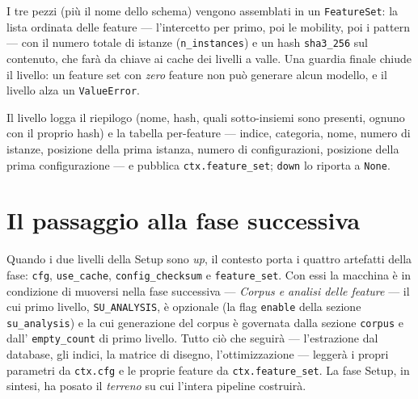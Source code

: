 I tre pezzi (più il nome dello schema) vengono assemblati in un
\texttt{FeatureSet}: la lista ordinata delle feature — l'intercetto per
primo, poi le mobility, poi i pattern — con il numero totale di istanze
(\texttt{n\_instances}) e un hash \texttt{sha3\_256} sul contenuto, che
farà da chiave ai cache dei livelli a valle. Una guardia finale chiude il
livello: un feature set con \emph{zero} feature non può generare alcun
modello, e il livello alza un \texttt{ValueError}.

Il livello logga il riepilogo (nome, hash, quali sotto-insiemi sono
presenti, ognuno con il proprio hash) e la tabella per-feature — indice,
categoria, nome, numero di istanze, posizione della prima istanza, numero di
configurazioni, posizione della prima configurazione — e pubblica
\texttt{ctx.feature\_set}; \texttt{down} lo riporta a \texttt{None}.

\section{Il passaggio alla fase successiva}

Quando i due livelli della Setup sono \emph{up}, il contesto porta i quattro
artefatti della fase: \texttt{cfg}, \texttt{use\_cache},
\texttt{config\_checksum} e \texttt{feature\_set}. Con essi la macchina è in
condizione di muoversi nella fase successiva — \emph{Corpus e analisi delle
feature} — il cui primo livello, \texttt{SU\_ANALYSIS}, è opzionale (la flag
\texttt{enable} della sezione \texttt{su\_analysis}) e la cui generazione del
corpus è governata dalla sezione \texttt{corpus} e dall'
\texttt{empty\_count} di primo livello. Tutto ciò che seguirà — l'estrazione
dal database, gli indici, la matrice di disegno, l'ottimizzazione — leggerà i
propri parametri da \texttt{ctx.cfg} e le proprie feature da
\texttt{ctx.feature\_set}. La fase Setup, in sintesi, ha posato il
\emph{terreno} su cui l'intera pipeline costruirà.
